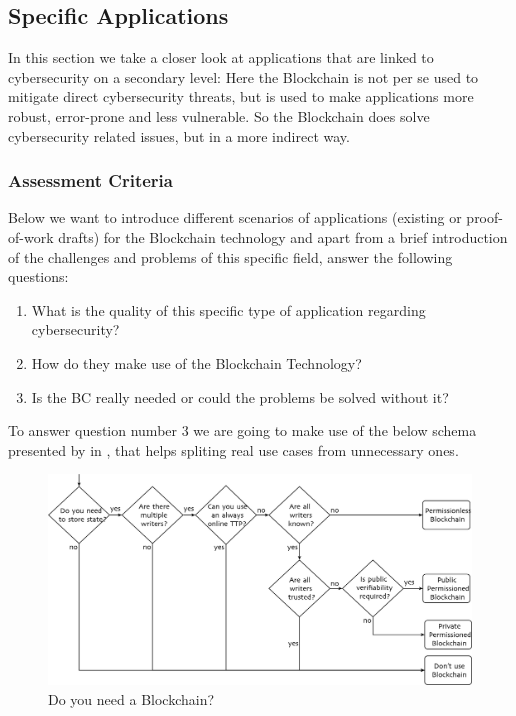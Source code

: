 \subsection{Specific Applications}
\label{subsec:03_applications}

In this section we take a closer look at applications that are linked to cybersecurity on a secondary level: Here the Blockchain is not per se used to mitigate direct cybersecurity threats, but is used to make applications more robust, error-prone and less vulnerable. So the Blockchain does solve cybersecurity related issues, but in a more indirect way.

\subsubsection{Assessment Criteria}
Below we want to introduce different scenarios of applications (existing or proof-of-work drafts) for the Blockchain technology and apart from a brief introduction of the challenges and problems of this specific field, answer the following questions:
\begin{enumerate}
	\item What is the quality of this specific type of application regarding cybersecurity? 
	\item How do they make use of the Blockchain Technology?
	\item Is the BC really needed or could the problems be solved without it? 
\end{enumerate}
To answer question number 3 we are going to make use of the below schema presented by \citeauthor{Wust2017} in \cite{Wust2017}, that helps spliting real use cases from unnecessary ones.
\begin{figure}[ht!]
  \begin{center}
  \includegraphics[scale=0.6]{Talk7/img/app/BCorNot}
  \end{center}
  \caption{Do you need a Blockchain?}
  \label{blockchain_or_not}
\end{figure}

